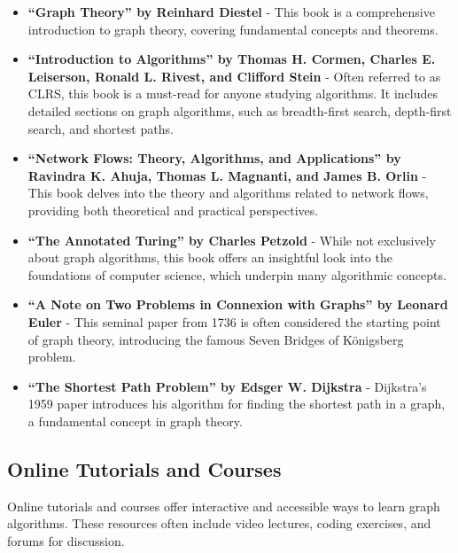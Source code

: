 \documentclass[12pt]{book} %
\begin{document}
\begin{itemize}
    \item \textbf{“Graph Theory” by Reinhard Diestel} - This book is a comprehensive introduction to graph theory, covering fundamental concepts and theorems.
    \item \textbf{“Introduction to Algorithms” by Thomas H. Cormen, Charles E. Leiserson, Ronald L. Rivest, and Clifford Stein} - Often referred to as CLRS, this book is a must-read for anyone studying algorithms. It includes detailed sections on graph algorithms, such as breadth-first search, depth-first search, and shortest paths.
    \item \textbf{“Network Flows: Theory, Algorithms, and Applications” by Ravindra K. Ahuja, Thomas L. Magnanti, and James B. Orlin} - This book delves into the theory and algorithms related to network flows, providing both theoretical and practical perspectives.
    \item \textbf{“The Annotated Turing” by Charles Petzold} - While not exclusively about graph algorithms, this book offers an insightful look into the foundations of computer science, which underpin many algorithmic concepts.
    \item \textbf{“A Note on Two Problems in Connexion with Graphs” by Leonard Euler} - This seminal paper from 1736 is often considered the starting point of graph theory, introducing the famous Seven Bridges of Königsberg problem.
    \item \textbf{“The Shortest Path Problem” by Edsger W. Dijkstra} - Dijkstra's 1959 paper introduces his algorithm for finding the shortest path in a graph, a fundamental concept in graph theory.
\end{itemize}

\subsection{Online Tutorials and Courses}
Online tutorials and courses offer interactive and accessible ways to learn graph algorithms. These resources often include video lectures, coding exercises, and forums for discussion.
\end{document}
